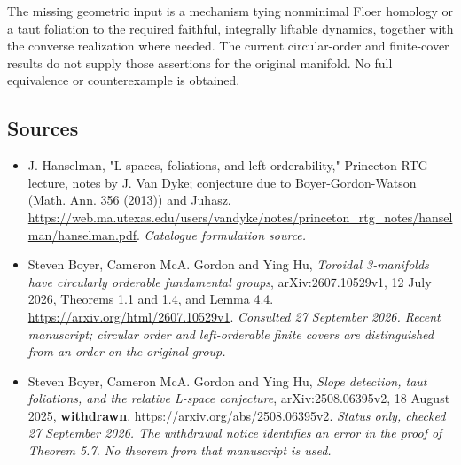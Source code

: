 \documentclass[11pt,a4paper]{article}
\numberwithin{equation}{section}
\begin{document}
The missing geometric input is a mechanism tying nonminimal Floer homology
or a taut foliation to the required faithful, integrally liftable dynamics,
together with the converse realization where needed. The current
circular-order and finite-cover results do not supply those assertions for
the original manifold. No full equivalence or counterexample is obtained.
\subsection{Sources}
\begin{itemize}\raggedright
\item[\textnormal{[S1]}]\hypertarget{source:181:1}{} J. Hanselman, "L-spaces, foliations, and left-orderability," Princeton RTG lecture, notes by J. Van Dyke; conjecture due to Boyer-Gordon-Watson (Math. Ann. 356 (2013)) and Juhasz.
\url{https://web.ma.utexas.edu/users/vandyke/notes/princeton_rtg_notes/hanselman/hanselman.pdf}.
{\small\textit{Catalogue formulation source.}}
\item[\textnormal{[E1]}]\hypertarget{extra:181:1}{} Steven Boyer, Cameron
McA. Gordon and Ying Hu, \emph{Toroidal 3-manifolds have circularly orderable
fundamental groups}, arXiv:2607.10529v1, 12 July 2026, Theorems 1.1 and 1.4,
and Lemma 4.4. \url{https://arxiv.org/html/2607.10529v1}.
{\small\textit{Consulted 27 September 2026. Recent manuscript; circular
order and left-orderable finite covers are distinguished from an order
on the original group.}}
\item[\textnormal{[E2]}]\hypertarget{extra:181:2}{} Steven Boyer, Cameron
McA. Gordon and Ying Hu, \emph{Slope detection, taut foliations, and the
relative L-space conjecture}, arXiv:2508.06395v2, 18 August 2025,
\textbf{withdrawn}. \url{https://arxiv.org/abs/2508.06395v2}.
{\small\textit{Status only, checked 27 September 2026. The withdrawal
notice identifies an error in the proof of Theorem 5.7. No theorem from
that manuscript is used.}}
\end{itemize}
\end{document}
